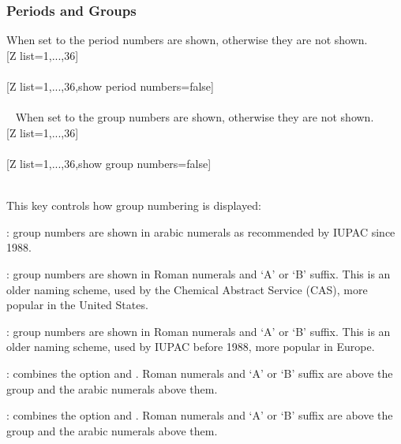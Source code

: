 \subsubsection{\texorpdfstring{ Periods and Groups}{Periods and Groups}}%
\label{option_show period numbers}%
%
{When set to  the period numbers are shown, otherwise they are not shown.}%
\\ [5pt][Z list={1,...,36}]%
\\ [5pt]\makebox[\linewidth][c]{\scalebox{.6}{\pgfPT[Z list={1,...,36}]}}%
\\ [10pt][Z list={1,...,36},show period numbers=false]%
\\ [5pt]\makebox[\linewidth][c]{\scalebox{.6}{\pgfPT[Z list={1,...,36},show period numbers=false]}}%
\\ [5pt]\pgfPTendoption%
\newpage\vspace{-34pt}\ %
\label{option_show group numbers}%
%
{When set to  the group numbers are shown, otherwise they are not shown.}%
\\ [5pt][Z list={1,...,36}]%
\\ [5pt]\makebox[\linewidth][c]{\scalebox{.6}{\pgfPT[Z list={1,...,36}]}}%
\\ [10pt][Z list={1,...,36},show group numbers=false]%
\\ [5pt]\makebox[\linewidth][c]{\scalebox{.6}{\pgfPT[Z list={1,...,36},show group numbers=false]}}%
\\ [0pt]\pgfPTendoption%
\vfill%
\label{option_group numbers}%
%
{This key controls how group numbering is displayed:
\vspace{4pt}\begin{itemlist}
\item{}: group numbers are shown in arabic numerals as recommended by IUPAC since 1988.
\item{}: group numbers are shown in Roman numerals and `A' or `B' suffix. This is an older naming scheme, used by the Chemical Abstract Service (CAS), more popular in the United States.
\item{}: group numbers are shown in Roman numerals and `A' or `B' suffix. This is an older naming scheme, used by IUPAC before 1988, more popular in Europe.
\item{}: combines the option  and . Roman numerals and `A' or `B' suffix are above the group and the arabic numerals above them.
\item{}: combines the option  and . Roman numerals and `A' or `B' suffix are above the group and the arabic numerals above them.
\end{itemlist}
}%
